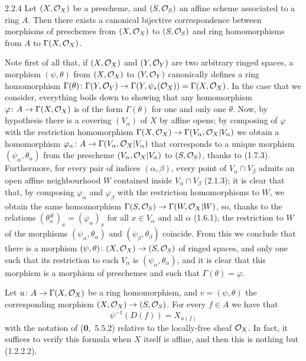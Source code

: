 \documentclass[../main.tex]{subfiles}
\begin{document}
\begin{env}[Proposition]{2.2.4}
    Let $(X,\mathcal{O}_X)$ be a prescheme, and $(S,\mathcal{O}_S)$ an affine scheme associated to a ring $A$.
    Then there exists a canonical bijective correspondence between morphisms of preschemes from $(X,\mathcal{O}_X)$ to $(S,\mathcal{O}_S)$ and ring homomorphisms from $A$ to $\Gamma(X,\mathcal{O}_X)$.
\end{env}
Note first of all that, if $(X,\mathcal{O}_X)$ and $(Y,\mathcal{O}_Y)$ are two arbitrary ringed spaces, a morphism $(\psi,\theta)$ from $(X,\mathcal{O}_X)$ to $(Y,\mathcal{O}_Y)$ canonically defines a ring homomorphism $\Gamma(\theta)\colon\Gamma(Y,\mathcal{O}_Y)\to\Gamma(Y,\psi_*(\mathcal{O}_X))=\Gamma(X,\mathcal{O}_X)$.
In the case that we consider, everything boils down to showing that any homomorphism $\varphi\colon A\to\Gamma(X,\mathcal{O}_X)$ is of the form $\Gamma(\theta)$ for one and only one $\theta$.
Now, by hypothesis there is a covering $(V_\alpha)$ of $X$ by affine opens; by composing of $\varphi$ with the restriction homomorphism $\Gamma(X,\mathcal{O}_X)\to\Gamma(V_\alpha,\mathcal{O}_X|V_\alpha)$ we obtain a homomorphism $\varphi_\alpha\colon A\to\Gamma(V_\alpha,\mathcal{O}_X|V_\alpha)$ that corresponds to a unique morphism $(\psi_\alpha,\theta_\alpha)$ from the prescheme $(V_\alpha,\mathcal{O}_X|V_\alpha)$ to $(S,\mathcal{O}_S)$, thanks to (1.7.3).
Furthermore, for every pair of indices $(\alpha,\beta)$, every point of $V_\alpha\cap V_\beta$ admits an open affine neighbourhood $W$ contained inside $V_\alpha\cap V_\beta$ (2.1.3); it is clear that that, by composing $\varphi_\alpha$ and $\varphi_\beta$ with the restriction homomorphisms to $W$, we obtain the same homomorphism $\Gamma(S,\mathcal{O}_S)\to\Gamma(W,\mathcal{O}_X|W)$, so, thanks to the relations $(\theta_\alpha^\#)_x=(\varphi_\alpha)_x$ for all $x\in V_\alpha$ and all $\alpha$ (1.6.1), the restriction to $W$ of the morphisms $(\psi_\alpha,\theta_\alpha)$ and $(\psi_\beta,\theta_\beta)$ coincide.
From this we conclude that there is a morphism $(\psi,\theta)\colon(X,\mathcal{O}_X)\to(S,\mathcal{O}_S)$ of ringed spaces, and only one such that its restriction to each $V_\alpha$ is $(\psi_\alpha,\theta_\alpha)$, and it is clear that this morphism is a morphism of preschemes and such that $\Gamma(\theta)=\varphi$.

Let $u\colon A\to\Gamma(X,\mathcal{O}_X)$ be a ring homomorphism, and $v=(\psi,\theta)$ the corresponding morphism $(X,\mathcal{O}_X)\to(S,\mathcal{O}_S)$.
For every $f\in A$ we have that
\begin{equation*}
    \psi^{-1}(D(f))=X_{u(f)}\tag{2.2.4.1}
\end{equation*}
with the notation of (\textbf{0},~5.5.2) relative to the locally-free sheaf $\mathcal{O}_X$.
In fact, it suffices to verify this formula when $X$ itself is affine, and then this is nothing but (1.2.2.2).
\end{document}

